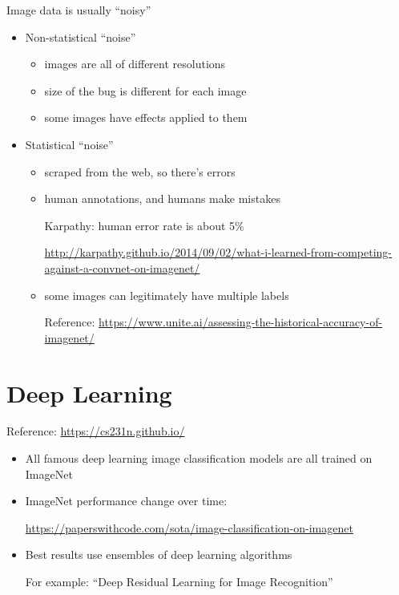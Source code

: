\documentclass[10pt]{exam}
\theoremstyle{definition}
\begin{document}
\noindent
Image data is usually ``noisy''

\begin{itemize}
    \item Non-statistical ``noise''

        \begin{itemize}
            \item images are all of different resolutions

            \item size of the bug is different for each image

            \item some images have effects applied to them
        \end{itemize}

    \item Statistical ``noise''

        \begin{itemize}
            \item scraped from the web, so there's errors
            \item human annotations, and humans make mistakes

                Karpathy: human error rate is about 5\%

                \hspace{-0.5in}\url{http://karpathy.github.io/2014/09/02/what-i-learned-from-competing-against-a-convnet-on-imagenet/}

            \item some images can legitimately have multiple labels

                Reference: \url{https://www.unite.ai/assessing-the-historical-accuracy-of-imagenet/}
        \end{itemize}
\end{itemize}


\newpage
\section{Deep Learning}

Reference: \url{https://cs231n.github.io/}

\begin{itemize}
    \item All famous deep learning image classification models are all trained on ImageNet

    \item ImageNet performance change over time:

        \url{https://paperswithcode.com/sota/image-classification-on-imagenet}

    \item Best results use ensembles of deep learning algorithms

        For example: ``Deep Residual Learning for Image Recognition''
\end{itemize}
\end{document}
